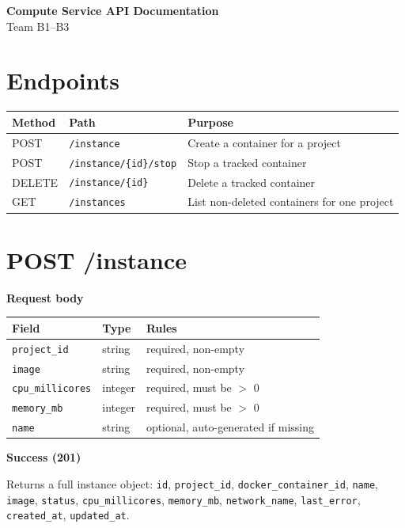 \documentclass[11pt]{article}
\begin{document}
\begin{center}
    {\LARGE \textbf{Compute Service API Documentation}}\\
    Team B1--B3
\end{center}

\section*{Endpoints}

\begin{tabularx}{\textwidth}{>{\raggedright\arraybackslash}p{2.2cm} >{\raggedright\arraybackslash}p{5.2cm} X}
\toprule
Method & Path & Purpose \\
\midrule
POST & \texttt{/instance} & Create a container for a project \\
POST & \texttt{/instance/\{id\}/stop} & Stop a tracked container \\
DELETE & \texttt{/instance/\{id\}} & Delete a tracked container \\
GET & \texttt{/instances} & List non-deleted containers for one project \\
\bottomrule
\end{tabularx}

\section*{POST /instance}

\textbf{Request body}

\begin{tabularx}{\textwidth}{>{\raggedright\arraybackslash}p{3.2cm} >{\raggedright\arraybackslash}p{1.6cm} X}
\toprule
Field & Type & Rules \\
\midrule
\texttt{project\_id} & string & required, non-empty \\
\texttt{image} & string & required, non-empty \\
\texttt{cpu\_millicores} & integer & required, must be $>$ 0 \\
\texttt{memory\_mb} & integer & required, must be $>$ 0 \\
\texttt{name} & string & optional, auto-generated if missing \\
\bottomrule
\end{tabularx}

\textbf{Success (201)}

Returns a full instance object:
\texttt{id}, \texttt{project\_id}, \texttt{docker\_container\_id}, \texttt{name}, \texttt{image},
\texttt{status}, \texttt{cpu\_millicores}, \texttt{memory\_mb}, \texttt{network\_name},
\texttt{last\_error}, \texttt{created\_at}, \texttt{updated\_at}.
\end{document}
